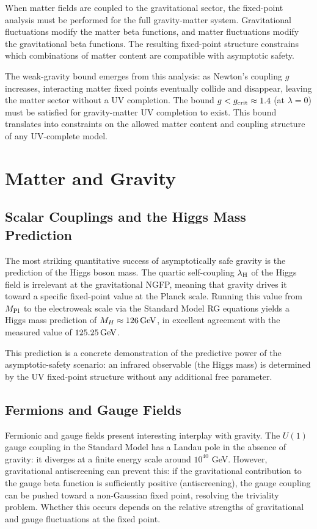 \documentclass[12pt,a4paper,oneside]{book}
\theoremstyle{definition}
\theoremstyle{plain}
\theoremstyle{remark}
\begin{document}
When matter fields are coupled to the gravitational sector, the fixed-point
analysis must be performed for the full gravity-matter system. Gravitational
fluctuations modify the matter beta functions, and matter fluctuations modify
the gravitational beta functions. The resulting fixed-point structure constrains
which combinations of matter content are compatible with asymptotic safety.

The weak-gravity bound emerges from this analysis: as Newton's coupling $g$
increases, interacting matter fixed points eventually collide and disappear,
leaving the matter sector without a UV completion. The bound $g < g_{\rm crit}
\approx 1.4$ (at $\lambda = 0$) must be satisfied for gravity-matter UV
completion to exist. This bound translates into constraints on the allowed
matter content and coupling structure of any UV-complete model.

\chapter{Matter and Gravity}

\section{Scalar Couplings and the Higgs Mass Prediction}

The most striking quantitative success of asymptotically safe gravity is the
prediction of the Higgs boson mass. The quartic self-coupling $\lambda_{\rm H}$
of the Higgs field is irrelevant at the gravitational NGFP, meaning that
gravity drives it toward a specific fixed-point value at the Planck scale.
Running this value from $M_{\rm Pl}$ to the electroweak scale via the
Standard Model RG equations yields a Higgs mass prediction of
$M_H \approx 126\,{\rm GeV}$, in excellent agreement with the measured value
of $125.25\,{\rm GeV}$.

This prediction is a concrete demonstration of the predictive power of the
asymptotic-safety scenario: an infrared observable (the Higgs mass) is
determined by the UV fixed-point structure without any additional free parameter.

\section{Fermions and Gauge Fields}

Fermionic and gauge fields present interesting interplay with gravity. The
$U(1)$ gauge coupling in the Standard Model has a Landau pole in the absence
of gravity: it diverges at a finite energy scale around $10^{40}$ GeV. However,
gravitational antiscreening can prevent this: if the gravitational contribution
to the gauge beta function is sufficiently positive (antiscreening), the gauge
coupling can be pushed toward a non-Gaussian fixed point, resolving the
triviality problem. Whether this occurs depends on the relative strengths
of gravitational and gauge fluctuations at the fixed point.
\end{document}
